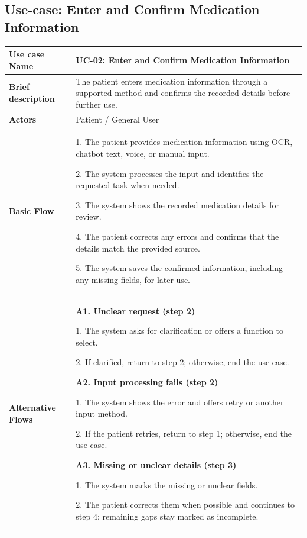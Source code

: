 
\subsection{Use-case: Enter and Confirm Medication Information}
\label{uc:uc-02}
\begin{longtable}{|p{}|p{}|}
\hline
\textbf{Use case Name} & UC-02: Enter and Confirm Medication Information \\ \hline
\textbf{Brief description} & The patient enters medication information through a supported method and confirms the recorded details before further use. \\ \hline
\textbf{Actors} & Patient / General User \\ \hline
\textbf{Basic Flow} &
1. The patient provides medication information using OCR, chatbot text, voice, or manual input.\par
2. The system processes the input and identifies the requested task when needed.\par
3. The system shows the recorded medication details for review.\par
4. The patient corrects any errors and confirms that the details match the provided source.\par
5. The system saves the confirmed information, including any missing fields, for later use.
\\ \hline
\textbf{Alternative Flows} &
\textbf{A1. Unclear request (step 2)}\par
1. The system asks for clarification or offers a function to select.\par
2. If clarified, return to step 2; otherwise, end the use case.
\par\smallskip
\textbf{A2. Input processing fails (step 2)}\par
1. The system shows the error and offers retry or another input method.\par
2. If the patient retries, return to step 1; otherwise, end the use case.
\par\smallskip
\textbf{A3. Missing or unclear details (step 3)}\par
1. The system marks the missing or unclear fields.\par
2. The patient corrects them when possible and continues to step 4; remaining gaps stay marked as incomplete.
\par\smallskip

\end{longtable}
